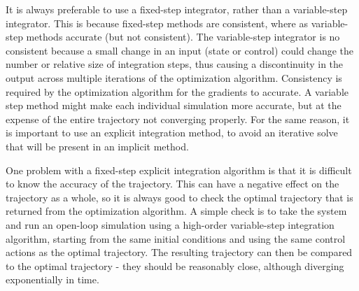 \par It is always preferable to use a fixed-step integrator, rather than a variable-step integrator. This is because fixed-step methods are consistent, where as variable-step methods accurate (but not consistent). The variable-step integrator is no consistent because a small change in an input (state or control) could change the number or relative size of integration steps, thus causing a discontinuity in the output across multiple iterations of the optimization algorithm. Consistency is required by the optimization algorithm for the gradients to accurate. A variable step method might make each individual simulation more accurate, but at the expense of the entire trajectory not converging properly. For the same reason, it is important to use an explicit integration method, to avoid an iterative solve that will be present in an implicit method.

\par One problem with a fixed-step explicit integration algorithm is that it is difficult to know the accuracy of the trajectory. This can have a negative effect on the trajectory as a whole, so it is always good to check the optimal trajectory that is returned from the optimization algorithm. A simple check is to take the system and run an open-loop simulation using a high-order variable-step integration algorithm, starting from the same initial conditions and using the same control actions as the optimal trajectory. The resulting trajectory can then be compared to the optimal trajectory - they should be reasonably close, although diverging exponentially in time.

